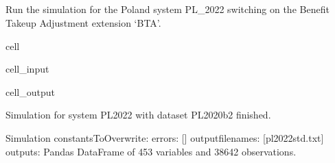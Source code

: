 \documentclass[letterpaper,10pt,english]{sphinxmanual}
\begin{document}
\subsection{}
\label{\detokenize{notebooks/example:run-with-extensions}}
\sphinxAtStartPar
Run the simulation for the Poland system PL\_2022 switching on the Benefit Take\sphinxhyphen{}up Adjustment extension ‘BTA’.

\begin{sphinxuseclass}{cell}
\begin{sphinxuseclass}{cell_input}
\begin{sphinxVerbatim}[commandchars=\\\{\}]
 \PYG{p}{[}\PYG{p}{]}\PYG{p}{[}\PYG{p}{]}\PYG{p}{[}\PYG{p}{]}
\end{sphinxVerbatim}

\end{sphinxuseclass}
\begin{sphinxuseclass}{cell_output}
\begin{sphinxVerbatim}[commandchars=\\\{\}]
Simulation for system PL\PYGZus{}2022 with dataset PL\PYGZus{}2020\PYGZus{}b2 finished.
\end{sphinxVerbatim}

\begin{sphinxVerbatim}[commandchars=\\\{\}]
\PYGZhy{}\PYGZhy{}\PYGZhy{}\PYGZhy{}\PYGZhy{}\PYGZhy{}\PYGZhy{}\PYGZhy{}\PYGZhy{}\PYGZhy{}\PYGZhy{}\PYGZhy{}\PYGZhy{}\PYGZhy{}\PYGZhy{}\PYGZhy{}\PYGZhy{}\PYGZhy{}\PYGZhy{}\PYGZhy{}\PYGZhy{}\PYGZhy{}\PYGZhy{}\PYGZhy{}\PYGZhy{}\PYGZhy{}\PYGZhy{}\PYGZhy{}\PYGZhy{}\PYGZhy{}
Simulation
\PYGZhy{}\PYGZhy{}\PYGZhy{}\PYGZhy{}\PYGZhy{}\PYGZhy{}\PYGZhy{}\PYGZhy{}\PYGZhy{}\PYGZhy{}\PYGZhy{}\PYGZhy{}\PYGZhy{}\PYGZhy{}\PYGZhy{}\PYGZhy{}\PYGZhy{}\PYGZhy{}\PYGZhy{}\PYGZhy{}\PYGZhy{}\PYGZhy{}\PYGZhy{}\PYGZhy{}\PYGZhy{}\PYGZhy{}\PYGZhy{}\PYGZhy{}\PYGZhy{}\PYGZhy{}
	 constantsToOverwrite: \PYGZob{}\PYGZcb{}
	 errors: []
	 output\PYGZus{}filenames: [\PYGZsq{}pl\PYGZus{}2022\PYGZus{}std.txt\PYGZsq{}]
	 outputs: Pandas DataFrame of 453 variables and 38642 observations.
\end{sphinxVerbatim}

\end{sphinxuseclass}
\end{sphinxuseclass}
\end{document}
